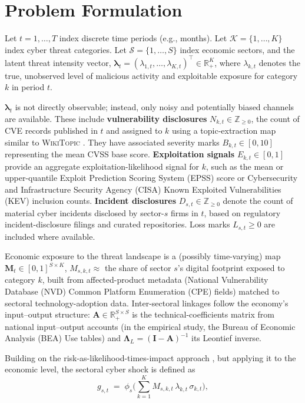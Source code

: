 \documentclass[review]{elsarticle}
\newcommand{\R}{\mathbb{R}}
\begin{document}
\FloatBarrier

\section{Problem Formulation}\label{sec:formulation}

Let $t = 1, \dots, T$ index discrete time periods (e.g., months).
Let $\mathcal{K} = \{1, \dots, K\}$ index cyber threat categories. Let $\mathcal{S} = \{1, \dots, S\}$ index economic sectors, 
and the latent threat intensity vector, $\bm{\lambda}_t = (\lambda_{1,t}, \dots, \lambda_{K,t})^\top \in \mathbb{R}_+^K$, where $\lambda_{k,t}$ denotes the true, unobserved level of malicious activity and exploitable exposure for category $k$ in period $t$.

$\bm{\lambda}_t $ is not directly observable; instead, only noisy and potentially biased channels are available. These include \textbf{vulnerability disclosures} $N_{k,t} \in \mathbb{Z}_{\geq 0}$, the count of CVE records published in $t$ and assigned to $k$ using a topic-extraction map similar to \textsc{WikiTopic} \citep{kia2024}. They have associated severity marks $B_{k,t} \in [0,10]$ representing the mean CVSS base score. \textbf{Exploitation signals} $E_{k,t} \in [0,1]$ provide an aggregate exploitation-likelihood signal for $k$, such as the mean or upper-quantile Exploit Prediction Scoring System (EPSS) score or Cybersecurity and Infrastructure Security Agency (CISA) Known Exploited Vulnerabilities (KEV) inclusion counts. \textbf{Incident disclosures} $D_{s,t} \in \mathbb{Z}_{\geq 0}$ denote the count of material cyber incidents disclosed by sector-$s$ firms in $t$, based on regulatory incident-disclosure filings and curated repositories. Loss marks $L_{s,t} \geq 0$ are included where available. 

Economic exposure to the threat landscape is a (possibly time-varying) map $\bm{M}_t \in [0,1]^{S \times K}$, $M_{s,k,t} \approx$ the share of sector $s$'s digital footprint exposed to category $k$, built from affected-product metadata (National Vulnerability Database (NVD) Common Platform Enumeration (CPE) fields) matched to sectoral technology-adoption data. Inter-sectoral linkages follow the economy's input--output structure: $\bm{A} \in \R_{+}^{S \times S}$ is the technical-coefficients matrix from national input--output accounts (in the empirical study, the Bureau of Economic Analysis (BEA) Use tables) and $\bm{\Lambda}_L = (\bm{I} - \bm{A})^{-1}$ its Leontief inverse.

Building on the risk-as-likelihood-times-impact approach \citep{kia2024}, but applying it to the economic level, the sectoral cyber shock is defined as
\begin{equation}\label{eq:shock}
    g_{s,t} \;=\; \phi_s\!\Big( \textstyle\sum_{k=1}^{K} M_{s,k,t}\, \lambda_{k,t}\, \sigma_{k,t} \Big),
\end{equation}
\end{document}
